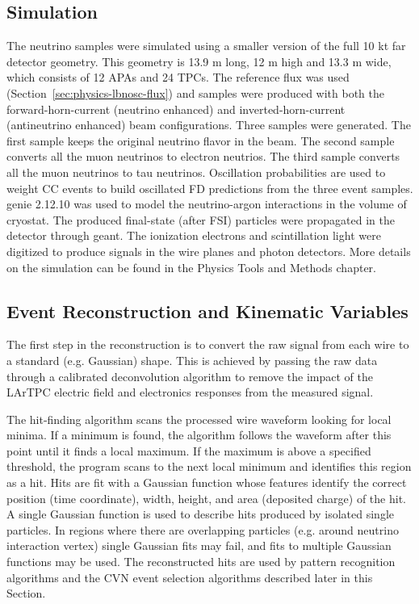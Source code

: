 \subsection{Simulation}
The neutrino samples were simulated using a smaller version of the full 10 kt far detector geometry. This geometry is 13.9 m long, 12 m high and 13.3 m wide, which consists of 12 APAs and 24 TPCs. The reference flux was used (Section~\ref{sec:physics-lbnosc-flux}) and samples were produced with both the forward-horn-current (neutrino enhanced) and inverted-horn-current (antineutrino enhanced) beam configurations. Three samples were generated. The first sample keeps the original neutrino flavor in the beam. The second sample converts all the muon neutrinos to electron neutrios. The third sample converts all the muon neutrinos to tau neutrinos. Oscillation probabilities are used to weight CC events to build oscillated FD predictions from the three event samples. {\sc genie} 2.12.10 was used to model the neutrino-argon interactions in the volume of cryostat. The produced final-state (after FSI) particles were propagated in the detector through {\sc geant}. The ionization electrons and scintillation light were digitized to produce signals in the wire planes and photon detectors. More details on the simulation can be found in the Physics Tools and Methods chapter.

\subsection{Event Reconstruction and Kinematic Variables}
The first step in the reconstruction is to convert the raw signal from each wire to a standard (e.g. Gaussian) shape. This is achieved by passing the raw data through a calibrated deconvolution algorithm to remove the impact of the LArTPC electric field and electronics responses from the measured signal.

The hit-finding algorithm scans the processed wire waveform looking for local minima. If a minimum is found, the algorithm follows the waveform after this point until it finds a local maximum. If the maximum is above a specified threshold, the program scans to the next local minimum and identifies this region as a hit. Hits are fit with a Gaussian function whose features identify the correct position (time coordinate), width, height, and area (deposited charge) of the hit. A single Gaussian function is used to describe hits produced by isolated single particles. In regions where there are overlapping particles (e.g. around neutrino interaction vertex) single Gaussian fits may fail, and fits to multiple Gaussian functions may be used. The reconstructed hits are used by pattern recognition algorithms and the CVN event selection algorithms described later in this Section.

